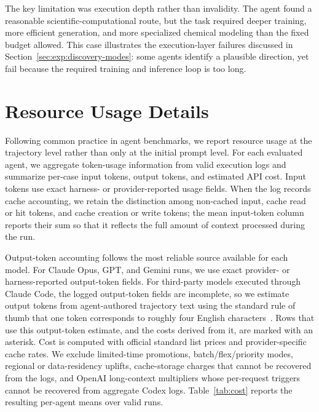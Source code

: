 The key limitation was execution depth rather than invalidity. The agent found a reasonable scientific-computational route, but the task required deeper training, more efficient generation, and more specialized chemical modeling than the fixed budget allowed. This case illustrates the execution-layer failures discussed in Section~\ref{sec:exp:discovery-modes}: some agents identify a plausible direction, yet fail because the required training and inference loop is too long.




\section{Resource Usage Details}
\label{app:cost}


Following common practice in agent benchmarks, we report resource usage at the trajectory level rather than only at the initial prompt level. For each evaluated agent, we aggregate token-usage information from valid execution logs and summarize per-case input tokens, output tokens, and estimated API cost. Input tokens use exact harness- or provider-reported usage fields. When the log records cache accounting, we retain the distinction among non-cached input, cache read or hit tokens, and cache creation or write tokens; the mean input-token column reports their sum so that it reflects the full amount of context processed during the run.

Output-token accounting follows the most reliable source available for each model. For Claude Opus, GPT, and Gemini runs, we use exact provider- or harness-reported output-token fields. For third-party models executed through Claude Code, the logged output-token fields are incomplete, so we estimate output tokens from agent-authored trajectory text using the standard rule of thumb that one token corresponds to roughly four English characters~\citep{openai2026tokens,anthropic2026pricing}. Rows that use this output-token estimate, and the costs derived from it, are marked with an asterisk. Cost is computed with official standard list prices and provider-specific cache rates. We exclude limited-time promotions, batch/flex/priority modes, regional or data-residency uplifts, cache-storage charges that cannot be recovered from the logs, and OpenAI long-context multipliers whose per-request triggers cannot be recovered from aggregate Codex logs.
Table~\ref{tab:cost} reports the resulting per-agent means over valid runs.

